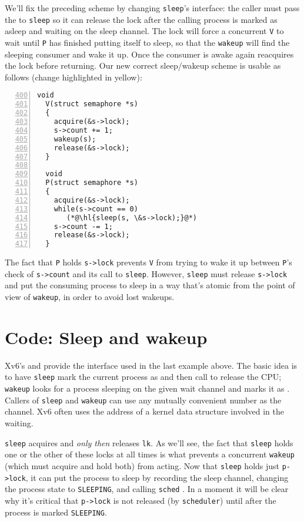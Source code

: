 We'll fix the preceding scheme by changing
\lstinline{sleep}'s
interface:
the caller must pass the  to
\lstinline{sleep}
so it can release the lock after
the calling process is marked as asleep and waiting on the
sleep channel.
The lock will force a concurrent
\lstinline{V}
to wait until \lstinline{P} has finished putting itself to sleep,
so that the
\lstinline{wakeup}
will find the sleeping consumer and wake it up.
Once the consumer is awake again
reacquires the lock before returning.
Our new correct sleep/wakeup scheme is usable as follows (change
highlighted in yellow):
\begin{lstlisting}[numbers=left,firstnumber=400]
  void
  V(struct semaphore *s)
  {
    acquire(&s->lock);
    s->count += 1;
    wakeup(s);
    release(&s->lock);
  }

  void
  P(struct semaphore *s)
  {
    acquire(&s->lock);
    while(s->count == 0)
       (*@\hl{sleep(s, \&s->lock);}@*)
    s->count -= 1;
    release(&s->lock);
  }
\end{lstlisting}

The fact that
\lstinline{P}
holds
\lstinline{s->lock}
prevents 
\lstinline{V}
from trying to wake it up between 
\lstinline{P}'s
check of
\lstinline{s->count}
and its call to
\lstinline{sleep}.
However, 
\lstinline{sleep}
must release
\lstinline{s->lock}
and put the consuming process to sleep
in a way that's atomic from the point of view of \lstinline{wakeup},
in order to avoid lost wakeups.

\section{Code: Sleep and wakeup}

Xv6's
and
provide the interface used in the last example above.
The basic idea is to have
\lstinline{sleep}
mark the current process as
and then call
to release the CPU;
\lstinline{wakeup}
looks for a process sleeping on the given wait channel
and marks it as 
.
Callers of
\lstinline{sleep}
and
\lstinline{wakeup}
can use any mutually convenient number as the channel.
Xv6 often uses the address
of a kernel data structure involved in the waiting.

\lstinline{sleep}
acquires 
and {\it only then} releases
\lstinline{lk}.
As we'll see, the fact that \lstinline{sleep}
holds one or the other of these locks at all times is what
prevents a concurrent \lstinline{wakeup}
(which must acquire and hold both) from acting.
Now that
\lstinline{sleep}
holds just
\lstinline{p->lock},
it can put the process to sleep by recording
the sleep channel,
changing the process state to \texttt{SLEEPING},
and calling
\lstinline{sched}
.
In a moment it will be clear why it's critical that
\lstinline{p->lock} is not released (by \lstinline{scheduler}) until after
the process is marked \texttt{SLEEPING}.

